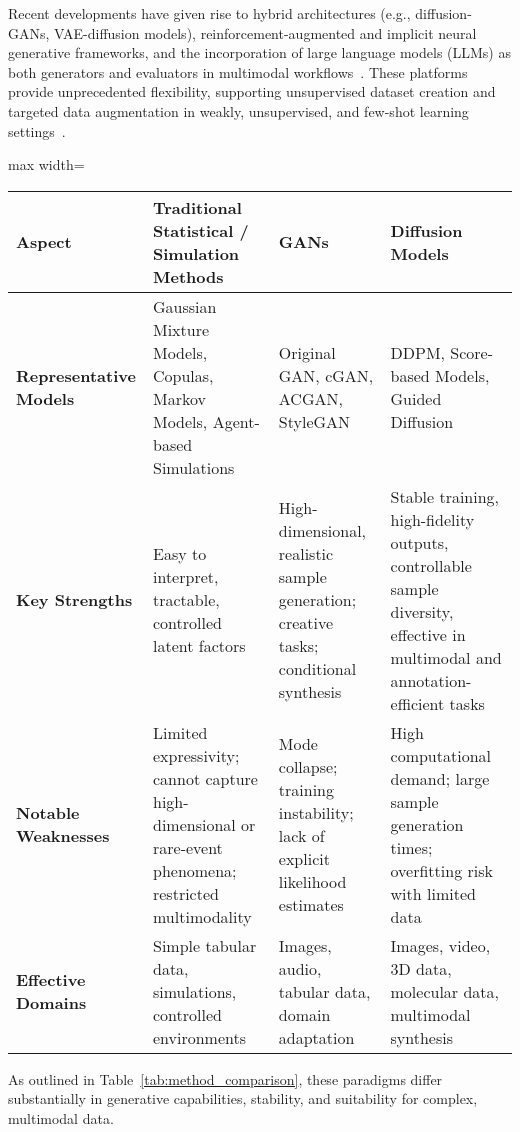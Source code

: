 \documentclass[sigconf]{acmart}
\begin{document}
Recent developments have given rise to hybrid architectures (e.g., diffusion-GANs, VAE-diffusion models), reinforcement-augmented and implicit neural generative frameworks, and the incorporation of large language models (LLMs) as both generators and evaluators in multimodal workflows~\cite{ref2,ref6,ref13,ref16,ref18,ref22,ref23,ref82,ref89,ref90}. These platforms provide unprecedented flexibility, supporting unsupervised dataset creation and targeted data augmentation in weakly, unsupervised, and few-shot learning settings~\cite{ref12,ref23,ref26,ref27,ref64,ref81}.

\begin{table*}[htbp]
\centering
\caption{Comparison of Classical, GAN, and Diffusion Approaches to Synthetic Data Generation}
\label{tab:method_comparison}
\begin{adjustbox}{max width=\textwidth}
\begin{tabular}{llll}
\toprule
\textbf{Aspect} & \textbf{Traditional Statistical / Simulation Methods} & \textbf{GANs} & \textbf{Diffusion Models} \\
\midrule
\textbf{Representative Models} & Gaussian Mixture Models, Copulas, Markov Models, Agent-based Simulations & Original GAN, cGAN, ACGAN, StyleGAN & DDPM, Score-based Models, Guided Diffusion \\
\textbf{Key Strengths} & Easy to interpret, tractable, controlled latent factors & High-dimensional, realistic sample generation; creative tasks; conditional synthesis & Stable training, high-fidelity outputs, controllable sample diversity, effective in multimodal and annotation-efficient tasks \\
\textbf{Notable Weaknesses} & Limited expressivity; cannot capture high-dimensional or rare-event phenomena; restricted multimodality & Mode collapse; training instability; lack of explicit likelihood estimates & High computational demand; large sample generation times; overfitting risk with limited data \\
\textbf{Effective Domains} & Simple tabular data, simulations, controlled environments & Images, audio, tabular data, domain adaptation & Images, video, 3D data, molecular data, multimodal synthesis \\
\bottomrule
\end{tabular}
\end{adjustbox}
\end{table*}

As outlined in Table~\ref{tab:method_comparison}, these paradigms differ substantially in generative capabilities, stability, and suitability for complex, multimodal data.
\end{document}
